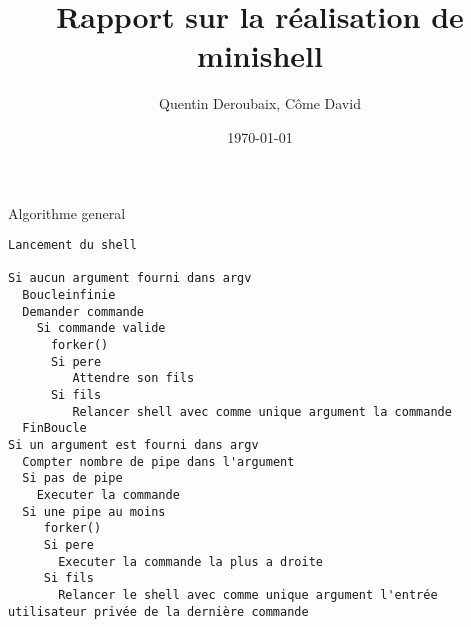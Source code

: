 \documentclass[fr]{report}
\begin{document}
\date{\today}

\title{Rapport sur la réalisation de minishell}
\author{Quentin Deroubaix, Côme David}
\maketitle
\tableofcontents

Algorithme general 
\begin{Verbatim}
Lancement du shell 

Si aucun argument fourni dans argv
  Boucleinfinie
  Demander commande
    Si commande valide
      forker() 
      Si pere 
         Attendre son fils
      Si fils 
         Relancer shell avec comme unique argument la commande
  FinBoucle
Si un argument est fourni dans argv
  Compter nombre de pipe dans l'argument
  Si pas de pipe
    Executer la commande
  Si une pipe au moins
     forker()
     Si pere
       Executer la commande la plus a droite
     Si fils
       Relancer le shell avec comme unique argument l'entrée utilisateur privée de la dernière commande
\end{Verbatim}
\end{document}
